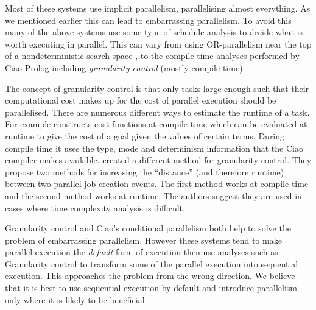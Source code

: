 Most of these systems use implicit parallelism, parallelising almost
everything.
As we mentioned earlier this can lead to embarrassing parallelism.
To avoid this many of the above systems use some type of schedule analysis
to decide what is worth executing in parallel.
This can vary from using OR-parallelism near the top of a nondeterministic
search space \citep{hausman:1987:or},
to the compile time analyses performed by Ciao Prolog
\citep{hermenegildo_ciao} including \emph{granularity control}
\citep{lopez96:distance_granularity} (mostly compile time).

The concept of granularity control
\citep{debray:1990:granularity} is that only tasks
large enough such that their computational cost makes up for the cost of
parallel execution should be parallelised.
There are numerous different ways to estimate the runtime of a task.
For example \citet{lopez96:distance_granularity} constructs cost functions
at compile time which can be evaluated at runtime to give the cost of a
goal given the values of certain terms.
During compile time it uses the type, mode and determinism information that
the Ciao compiler makes available.
\citet{shen_98_granularity-control} created a different method for
granularity control.
They propose two methods for increasing the ``distance''
(and therefore runtime)
between two parallel job creation events.
The first method works at compile time and the second method works at
runtime.
The authors suggest they are used in cases where time complexity
analysis is difficult.

Granularity control and Ciao's conditional parallelism both help to
solve the problem of embarrassing parallelism.
However these systems tend to make parallel execution the \emph{default}
form of execution then use analyses such as Granularity control to
transform some of the parallel execution into sequential execution.
This approaches the problem from the wrong direction.
We believe that it is best to use sequential execution by default and
introduce parallelism only where it is likely to be beneficial.

